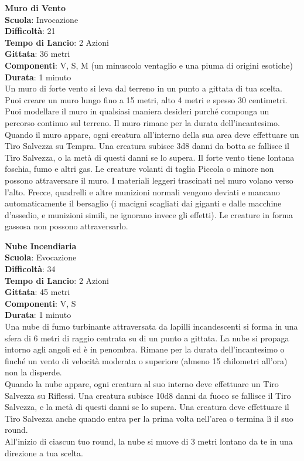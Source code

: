\begin{multicols}{2}
\medskip\textbf{Muro di Vento}\\
\textbf{Scuola}: Invocazione\\
\textbf{Difficoltà}: 21\\
\textbf{Tempo di Lancio}: 2 Azioni\\
\textbf{Gittata}: 36 metri\\
\textbf{Componenti}: V, S, M (un minuscolo ventaglio e una piuma di origini esotiche)\\
\textbf{Durata}: 1 minuto\\
Un muro di forte vento si leva dal terreno in un punto a gittata di tua scelta. Puoi creare un muro lungo fino a 15 metri, alto 4 metri e spesso 30 centimetri. Puoi modellare il muro in qualsiasi maniera desideri purché componga un percorso continuo sul terreno. Il muro rimane per la durata dell'incantesimo. Quando il muro appare, ogni creatura all'interno della sua area deve effettuare un Tiro Salvezza su Tempra. Una creatura subisce 3d8 danni da botta se fallisce il Tiro Salvezza, o la metà di questi danni se lo supera. Il forte vento tiene lontana foschia, fumo e altri gas. Le creature volanti di taglia Piccola o minore non possono attraversare il muro. I materiali leggeri trascinati nel muro volano verso l'alto. Frecce, quadrelli e altre munizioni normali vengono deviati e mancano automaticamente il bersaglio (i macigni scagliati dai giganti e dalle macchine d'assedio, e munizioni simili, ne ignorano invece gli effetti). Le creature in forma gassosa non possono attraversarlo.

\medskip\textbf{Nube Incendiaria}\\
\textbf{Scuola}: Evocazione\\
\textbf{Difficoltà}: 34\\
\textbf{Tempo di Lancio}: 2 Azioni\\
\textbf{Gittata}: 45 metri\\
\textbf{Componenti}: V, S\\
\textbf{Durata}: 1 minuto\\
Una nube di fumo turbinante attraversata da lapilli incandescenti si forma in una sfera di 6 metri di raggio centrata su di un punto a gittata. La nube si propaga intorno agli angoli ed è in penombra. Rimane per la durata dell'incantesimo o finché un vento di velocità moderata o superiore (almeno 15 chilometri all'ora) non la disperde.\\
Quando la nube appare, ogni creatura al suo interno deve effettuare un Tiro Salvezza su Riflessi. Una creatura subisce 10d8 danni da fuoco se fallisce il Tiro Salvezza, e la metà di questi danni se lo supera. Una creatura deve effettuare il Tiro Salvezza anche quando entra per la prima volta nell'area o termina lì il suo round.\\
All'inizio di ciascun tuo round, la nube si muove di 3 metri lontano da te in una direzione a tua scelta. \\


\end{multicols}
